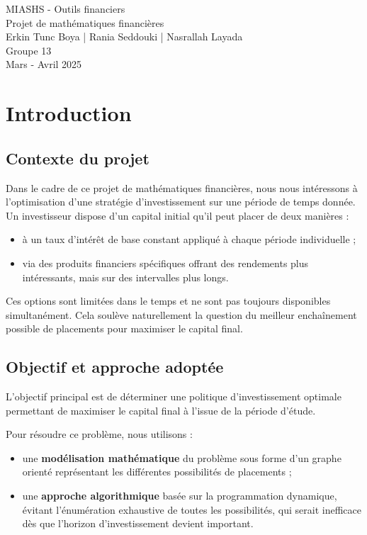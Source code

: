 \documentclass[a4paper,11pt]{article}
\begin{document}
    \begin{center}
        \Huge{MIASHS - Outils financiers}\\[0.5cm]
        \LARGE{Projet de mathématiques financières}\\[0.2cm]
        \Large{Erkin Tunc Boya | Rania Seddouki |  Nasrallah Layada }\\
        \Large{Groupe 13} \\
        \Large{Mars - Avril 2025}
    \end{center}

    \tableofcontents
    \section{Introduction}

    \subsection{Contexte du projet}

    Dans le cadre de ce projet de mathématiques financières, nous nous intéressons à l’optimisation d’une stratégie d’investissement sur une période de temps donnée. Un investisseur dispose d’un capital initial qu’il peut placer de deux manières :
    \begin{itemize}
        \item à un taux d’intérêt de base constant appliqué à chaque période individuelle ;
        \item via des produits financiers spécifiques offrant des rendements plus intéressants, mais sur des intervalles plus longs.
    \end{itemize}

    Ces options sont limitées dans le temps et ne sont pas toujours disponibles simultanément. Cela soulève naturellement la question du meilleur enchaînement possible de placements pour maximiser le capital final.

    \subsection{Objectif et approche adoptée}

    L’objectif principal est de déterminer une politique d’investissement optimale permettant de maximiser le capital final à l’issue de la période d’étude.

    Pour résoudre ce problème, nous utilisons :
    \begin{itemize}
        \item une \textbf{modélisation mathématique} du problème sous forme d’un graphe orienté représentant les différentes possibilités de placements ;
        \item une \textbf{approche algorithmique} basée sur la programmation dynamique, évitant l’énumération exhaustive de toutes les possibilités, qui serait inefficace dès que l’horizon d’investissement devient important.
    \end{itemize}
\end{document}
